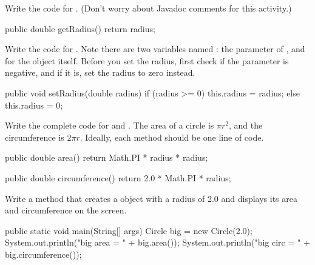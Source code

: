\Q Write the code for . (Don't worry about Javadoc comments for this activity.)

\begin{answer}[5em]
\begin{javaans}
    public double getRadius() {
        return radius;
    }
\end{javaans}
\end{answer}


\Q Write the code for . Note there are two variables named : the parameter of , and  for the object itself. Before you set the radius, first check if the parameter is negative, and if it is, set the radius to zero instead.

\begin{answer}[11em]
\begin{javaans}
    public void setRadius(double radius) {
        if (radius >= 0) {
            this.radius = radius;
        }
        else {
            this.radius = 0;
        }
    }
\end{javaans}
\end{answer}


\Q Write the complete code for  and .
The area of a circle is $\pi r^2$, and the circumference is $2 \pi r$.
Ideally, each method should be one line of code.

\begin{answer}[10em]
\begin{javaans}
    public double area() {
        return Math.PI * radius * radius;
    }

    public double circumference() {
        return 2.0 * Math.PI * radius;
    }
\end{javaans}
\end{answer}


\Q Write a  method that creates a  object with a radius of 2.0 and displays its area and circumference on the screen.

\begin{answer}[7em]
\begin{javaans}
    public static void main(String[] args) {
        Circle big = new Circle(2.0);
        System.out.println("big area = " + big.area());
        System.out.println("big circ = " + big.circumference());
    }
\end{javaans}
\end{answer}
